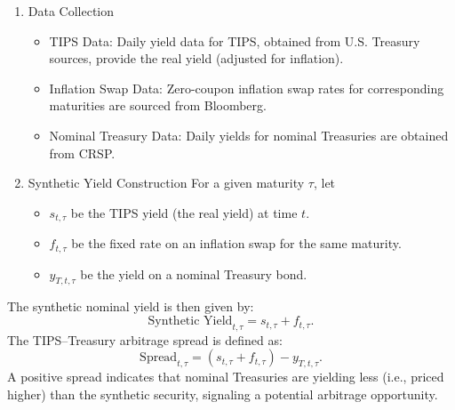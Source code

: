 \documentclass[12pt]{article}
\begin{document}
\begin{enumerate}
  \item Data Collection
  \begin{itemize}
    \item TIPS Data: Daily yield data for TIPS, obtained from U.S. Treasury sources, provide the real yield (adjusted for inflation).  
    \item Inflation Swap Data: Zero-coupon inflation swap rates for corresponding maturities are sourced from Bloomberg.  
    \item Nominal Treasury Data: Daily yields for nominal Treasuries are obtained from CRSP.  
  \end{itemize}
  

  \item Synthetic Yield Construction
  For a given maturity \(\tau\), let
  \begin{itemize}
    \item \(s_{t,\tau}\) be the TIPS yield (the real yield) at time \(t\).
    \item  \(f_{t,\tau}\) be the fixed rate on an inflation swap for the same maturity.
    \item  \(y_{T,t,\tau}\) be the yield on a nominal Treasury bond.
  \end{itemize} 
\end{enumerate}
The synthetic nominal yield is then given by:
\[
\text{Synthetic Yield}_{t,\tau} = s_{t,\tau} + f_{t,\tau}.
\]
The TIPS–Treasury arbitrage spread is defined as:
\[
\text{Spread}_{t,\tau} = (s_{t,\tau} + f_{t,\tau}) - y_{T,t,\tau}.
\]
A positive spread indicates that nominal Treasuries are yielding less (i.e., priced higher) than the synthetic security, 
signaling a potential arbitrage opportunity.
\end{document}
